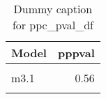 \begin{table}
\centering
\caption{Dummy caption for ppc_pval_df}
\centering
\fontsize{10}{12}\selectfont
\begin{tabular}[t]{lr}
\toprule
Model & pppval\\
\midrule
\cellcolor{gray!10}{m2} & \cellcolor{gray!10}{0.56}\\
m3.1 & 0.56\\
\cellcolor{gray!10}{m4} & \cellcolor{gray!10}{0.55}\\
\bottomrule
\end{tabular}
\end{table}
